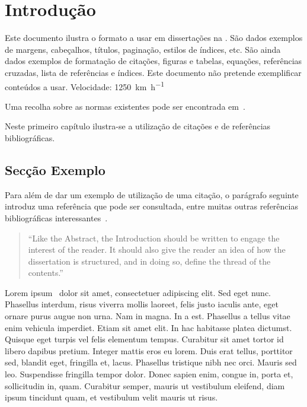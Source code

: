 \chapter{Introdução} \label{chap:intro}

Este documento ilustra o formato a usar em dissertações na \Feup.
São dados exemplos de margens, cabeçalhos, títulos, paginação, estilos de índices, etc. 
São ainda dados exemplos de formatação de citações, figuras e tabelas,
equações, referências cruzadas, lista de referências e índices.
Este documento não pretende exemplificar conteúdos a usar. Velocidade: \SI{1250}{\kilo\meter\per\hour}

Uma recolha sobre as normas existentes pode ser encontrada em~\citet{kn:Mat93}.

Neste primeiro capítulo ilustra-se a utilização de citações e de
referências bibliográficas. 

\section{Secção Exemplo} \label{sec:context}

Para além de dar um exemplo de utilização de uma citação, o parágrafo
seguinte introduz uma referência que pode ser consultada, entre muitas
outras referências bibliográficas interessantes~\citep{kn:Tha01,kn:PP05}.

\begin{quote}
  ``Like the Abstract, the Introduction should be written to engage the
  interest of the reader. It should also give the reader an idea of
  how the dissertation is structured, and in doing so, define the
  thread of the contents.''~\citep[chap.\ Introduction]{kn:Tha01} 
\end{quote}

Lorem ipsum~\citep{kn:Lip08} dolor sit amet, consectetuer adipiscing
elit. 
Sed eget nunc. Phasellus interdum, risus viverra mollis laoreet, felis
justo iaculis ante, eget ornare purus augue non urna. Nam in magna. In a
est. Phasellus a tellus vitae enim vehicula imperdiet. Etiam sit amet
elit. In hac habitasse platea dictumst. Quisque eget turpis vel felis
elementum tempus. Curabitur sit amet tortor id libero dapibus
pretium. Integer mattis eros eu lorem. Duis erat tellus, porttitor
sed, blandit eget, fringilla et, lacus. Phasellus tristique nibh nec
orci. Mauris sed leo. Suspendisse fringilla tempor dolor. Donec sapien
enim, congue in, porta et, sollicitudin in, quam. Curabitur semper,
mauris ut vestibulum eleifend, diam ipsum tincidunt quam, et
vestibulum velit mauris ut risus. 

